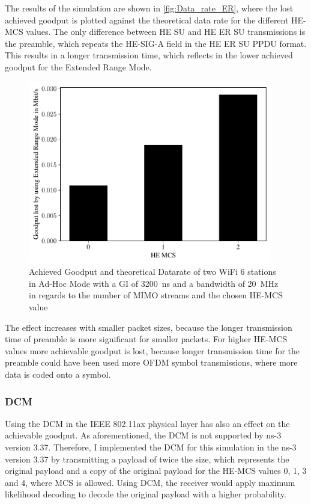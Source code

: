 The results of the simulation are shown in \autoref{fig:Data_rate_ER}, where the lost achieved goodput is plotted against the theoretical data rate for the different HE-\ac{MCS} values.
The only difference between HE SU and HE ER SU transmissions is the preamble, which repeats the HE-SIG-A field in the HE ER SU PPDU format.
This results in a longer transmission time, which reflects in the lower achieved goodput for the Extended Range Mode.
\begin{figure}[H]%
	\centering
	\includegraphics[width=0.95\textwidth]{figures/ER_dataRate_simulation.pdf}
	\caption{Achieved Goodput and theoretical Datarate of two WiFi 6 stations in Ad-Hoc Mode with a \acf{GI} of \SI{3200}{\nano\second} and a bandwidth of \SI{20}{\mega\hertz} in regards to the number of \acf{MIMO} streams and the chosen HE-\ac{MCS} value}%
	\label{fig:Data_rate_ER}%
\end{figure}
The effect increases with smaller packet sizes, because the longer transmission time of preamble is more significant for smaller packets.
For higher HE-\ac{MCS} values more achievable goodput is lost, because longer transmission time for the preamble could have
been used more \ac{OFDM} symbol transmissions, where more data is coded onto a symbol.


\subsubsection*{\acf{DCM}}
Using the \ac{DCM} in the IEEE 802.11ax physical layer has also an effect on the achievable goodput.
As aforementioned, the \ac{DCM} is not supported by ns-3 version 3.37.
Therefore, I implemented the \ac{DCM} for this simulation in the ns-3 version 3.37 by transmitting a payload of twice the size, which represents the original payload and a
copy of the original payload for the HE-\ac{MCS} values 0, 1, 3 and 4, where \ac{MCS} is allowed.
Using \ac{DCM}, the receiver would apply maximum likelihood decoding to decode the original payload with a higher probability.

